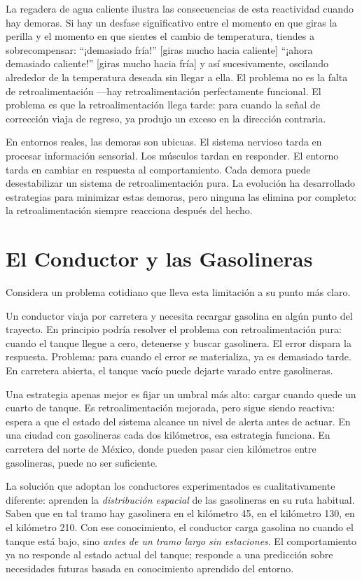 \documentclass[
  letterpaper,
  DIV=11,
  numbers=noendperiod]{scrreprt}
\begin{document}
\begin{tcolorbox}[enhanced jigsaw, arc=.35mm, bottomrule=.15mm, breakable, colback=white, colframe=quarto-callout-note-color-frame, left=2mm, leftrule=.75mm, opacityback=0, rightrule=.15mm, toprule=.15mm]
La regadera de agua caliente ilustra las consecuencias de esta
reactividad cuando hay demoras. Si hay un desfase significativo entre el
momento en que giras la perilla y el momento en que sientes el cambio de
temperatura, tiendes a sobrecompensar: ``¡demasiado fría!'' {[}giras
mucho hacia caliente{]} ``¡ahora demasiado caliente!'' {[}giras mucho
hacia fría{]} y así sucesivamente, oscilando alrededor de la temperatura
deseada sin llegar a ella. El problema no es la falta de
retroalimentación ---hay retroalimentación perfectamente funcional. El
problema es que la retroalimentación llega tarde: para cuando la señal
de corrección viaja de regreso, ya produjo un exceso en la dirección
contraria.

En entornos reales, las demoras son ubicuas. El sistema nervioso tarda
en procesar información sensorial. Los músculos tardan en responder. El
entorno tarda en cambiar en respuesta al comportamiento. Cada demora
puede desestabilizar un sistema de retroalimentación pura. La evolución
ha desarrollado estrategias para minimizar estas demoras, pero ninguna
las elimina por completo: la retroalimentación siempre reacciona después
del hecho.

\section{El Conductor y las
Gasolineras}\label{el-conductor-y-las-gasolineras}

Considera un problema cotidiano que lleva esta limitación a su punto más
claro.

Un conductor viaja por carretera y necesita recargar gasolina en algún
punto del trayecto. En principio podría resolver el problema con
retroalimentación pura: cuando el tanque llegue a cero, detenerse y
buscar gasolinera. El error dispara la respuesta. Problema: para cuando
el error se materializa, ya es demasiado tarde. En carretera abierta, el
tanque vacío puede dejarte varado entre gasolineras.

Una estrategia apenas mejor es fijar un umbral más alto: cargar cuando
quede un cuarto de tanque. Es retroalimentación mejorada, pero sigue
siendo reactiva: espera a que el estado del sistema alcance un nivel de
alerta antes de actuar. En una ciudad con gasolineras cada dos
kilómetros, esa estrategia funciona. En carretera del norte de México,
donde pueden pasar cien kilómetros entre gasolineras, puede no ser
suficiente.

La solución que adoptan los conductores experimentados es
cualitativamente diferente: aprenden la \emph{distribución espacial} de
las gasolineras en su ruta habitual. Saben que en tal tramo hay
gasolinera en el kilómetro 45, en el kilómetro 130, en el kilómetro 210.
Con ese conocimiento, el conductor carga gasolina no cuando el tanque
está bajo, sino \emph{antes de un tramo largo sin estaciones}. El
comportamiento ya no responde al estado actual del tanque; responde a
una predicción sobre necesidades futuras basada en conocimiento
aprendido del entorno.


\end{tcolorbox}
\end{document}
